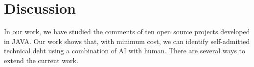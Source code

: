 \documentclass[10pt,conference]{IEEEtran}
\begin{document}
% 
\section{Discussion}
\label{section discussion}
 

 
In our work, we have studied the comments of ten open source projects developed in JAVA. 
Our work shows that, with minimum cost, we can identify
self-admitted technical debt
using a combination of AI with human. 
There are several ways to extend the current work.
\end{document}
